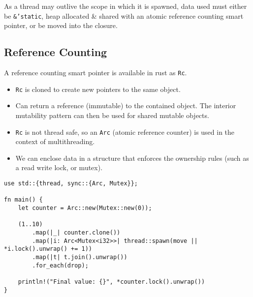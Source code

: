 As a thread may outlive the scope in which it is spawned, data used must either be \texttt{&'static}, heap allocated \& shared with an atomic reference counting smart pointer, or be moved into the closure.
\subsection{Reference Counting}
A reference counting smart pointer is available in rust as \texttt{Rc}.
\begin{itemize}
	\item \texttt{Rc} is cloned to create new pointers to the same object.
	\item Can return a reference (immutable) to the contained object. The interior mutability pattern can then be used for shared mutable objects.
	\item \texttt{Rc} is not thread safe, so an \texttt{Arc} (atomic reference counter) is used in the context of multithreading.
	\item We can enclose data in a structure that enforces the ownership rules (such as a read write lock, or mutex).
\end{itemize}
\begin{verbatim}
use std::{thread, sync::{Arc, Mutex}};

fn main() {
    let counter = Arc::new(Mutex::new(0));

    (1..10)
        .map(|_| counter.clone())
        .map(|i: Arc<Mutex<i32>>| thread::spawn(move || *i.lock().unwrap() += 1))
        .map(|t| t.join().unwrap())
        .for_each(drop);
    
    println!("Final value: {}", *counter.lock().unwrap())
}
\end{verbatim}


\unfinished